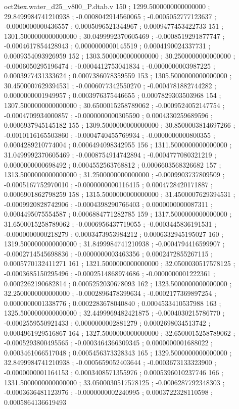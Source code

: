 \begin{filecontents}[overwrite]{oct2tex.water_d25_v800_P.dtab.v}
150 ; 1299.5000000000000000 ; 29.8499984741210938 ; -0.0008042914560065 ; -0.0005052777123637 ; -0.0000000000436557 ; 0.0005096521344967 ; 0.0009477453422733
151 ; 1301.5000000000000000 ; 30.0499992370605469 ; -0.0008519291877747 ; -0.0004617854428943 ; 0.0000000000145519 ; 0.0004190024337731 ; 0.0009354093926959
152 ; 1303.5000000000000000 ; 30.2500000000000000 ; -0.0006050295196474 ; -0.0004412753041834 ; -0.0000000003987225 ; 0.0003977431333624 ; 0.0007386078359559
153 ; 1305.5000000000000000 ; 30.4500007629394531 ; -0.0006077342550270 ; -0.0004781882744282 ; 0.0000000001949957 ; 0.0003976375446655 ; 0.0007829303503968
154 ; 1307.5000000000000000 ; 30.6500015258789062 ; -0.0009524052147754 ; -0.0004709934000857 ; -0.0000000000305590 ; 0.0004330259689596 ; 0.0006937945145182
155 ; 1309.5000000000000000 ; 30.8500003814697266 ; -0.0010116165503860 ; -0.0004740455769934 ; -0.0000000000800355 ; 0.0004289210774004 ; 0.0006494098342955
156 ; 1311.5000000000000000 ; 31.0499992370605469 ; -0.0008754914742894 ; -0.0004777080321219 ; 0.0000000000698492 ; 0.0004552563768812 ; 0.0006603568326682
157 ; 1313.5000000000000000 ; 31.2500000000000000 ; -0.0009903737809509 ; -0.0005167752970010 ; -0.0000000000116415 ; 0.0004728420171887 ; 0.0006901862798259
158 ; 1315.5000000000000000 ; 31.4500007629394531 ; -0.0009920828742906 ; -0.0004398290766403 ; 0.0000000000087311 ; 0.0004495075554587 ; 0.0006884771282785
159 ; 1317.5000000000000000 ; 31.6500015258789062 ; -0.0006956437719055 ; -0.0003445836191531 ; -0.0000000000218279 ; 0.0003473953984212 ; 0.0006332945195027
160 ; 1319.5000000000000000 ; 31.8499984741210938 ; -0.0004794416599907 ; -0.0002714545698836 ; -0.0000000003463356 ; 0.0002472855267115 ; 0.0005770132411271
161 ; 1321.5000000000000000 ; 32.0500030517578125 ; -0.0003685150295496 ; -0.0002514868974686 ; -0.0000000001222361 ; 0.0002262190682814 ; 0.0005252030678093
162 ; 1323.5000000000000000 ; 32.2500000000000000 ; -0.0002896478399634 ; -0.0002177369897254 ; 0.0000000001338776 ; 0.0002283678040840 ; 0.0004533410537988
163 ; 1325.5000000000000000 ; 32.4499969482421875 ; -0.0004030215786770 ; -0.0002559550921433 ; 0.0000000002881279 ; 0.0002698034513742 ; 0.0004961929516867
164 ; 1327.5000000000000000 ; 32.6500015258789062 ; -0.0005293800495565 ; -0.0003464366309345 ; 0.0000000001688022 ; 0.0003461066517048 ; 0.0005456373328343
165 ; 1329.5000000000000000 ; 32.8499984741210938 ; -0.0005659052403644 ; -0.0003673133323900 ; -0.0000000001164153 ; 0.0003408571355976 ; 0.0005396010237746
166 ; 1331.5000000000000000 ; 33.0500030517578125 ; -0.0006287792348303 ; -0.0003636481123976 ; -0.0000000002240995 ; 0.0003722328110598 ; 0.0005864136619493

\end{filecontents}
